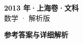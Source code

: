 \documentclass[zihao=-4, a4paper]{ctexart}
\begin{document}
\begin{center}
  {\Large\bfseries 2013 年·上海卷·文科}\\[4pt]
  {\large 数学 · 解析版}
\end{center}
\medskip
{}

\clearpage
{}
\begin{center}{\Large\bfseries 参考答案与详细解析}\end{center}
\medskip

\end{document}
